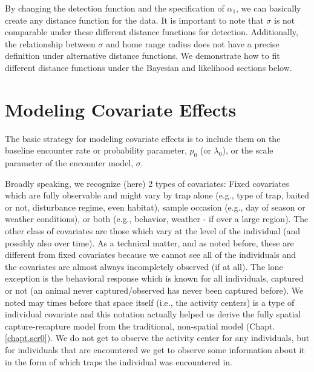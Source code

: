 By changing the detection function and the specification of
$\alpha_1$, we can basically create any distance function for the
data. It is important to note that $\sigma$ is not comparable under
these different distance functions for detection.  Additionally, the
relationship between $\sigma$ and home range radius does not have
a precise definition under alternative distance functions.  We
demonstrate how to fit different distance functions under the Bayesian
and likelihood sections below.


\section{Modeling Covariate Effects}


The basic strategy for modeling covariate effects is to include them
on the baseline encounter rate or probability parameter, $p_{0}$ (or
$\lambda_{0}$), or the scale parameter of the encounter model,
$\sigma$.

Broadly speaking, we recognize (here) 2 types of covariates: Fixed
covariates which are fully observable and might vary by trap alone
(e.g., type of trap, baited or not, disturbance regime, even habitat),
sample occasion (e.g., day of season or weather conditions), or both
(e.g., behavior, weather - if over a large region).  The other class
of covariates are those which vary at the level of the individual (and
possibly also over time).  As a technical matter, and as noted before,
these are different from fixed covariates because we cannot see all of
the individuals and the covariates are almost always incompletely
observed (if at all).  The lone exception is the behavioral response
which is known for all individuals, captured or not (an animal never
captured/observed has never been captured before).  We noted may times
before that space itself (i.e., the activity centers) is a type of
individual covariate and this notation actually helped us derive the
fully spatial capture-recapture model from the traditional,
non-spatial model (Chapt. \ref{chapt.scr0}). We do not get to observe
the activity center for any individuals, but for individuals that are
encountered we get to observe some information about it in the form of
which traps the individual was encountered in.


